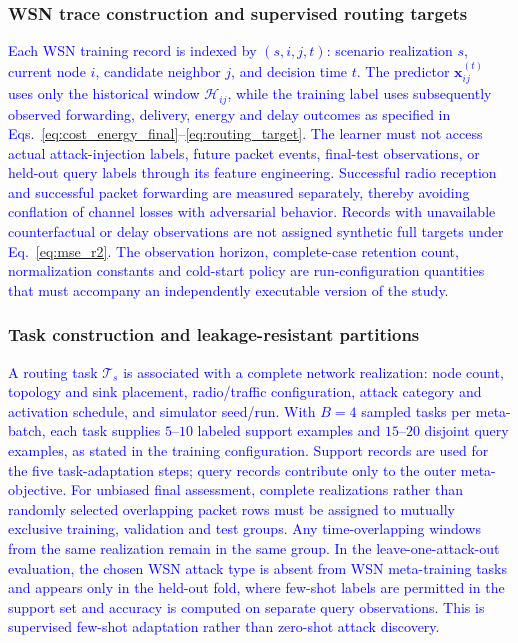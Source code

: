 \documentclass[pdflatex,sn-mathphys-num]{sn-jnl}
\newcommand{\Revised}[1]{\textcolor{blue}{#1}}
\begin{document}
\subsubsection{WSN trace construction and supervised routing targets}
\Revised{Each WSN training record is indexed by $(s,i,j,t)$: scenario realization $s$, current node $i$, candidate neighbor $j$, and decision time $t$. The predictor $\mathbf x_{ij}^{(t)}$ uses only the historical window $\mathcal H_{ij}$, while the training label uses subsequently observed forwarding, delivery, energy and delay outcomes as specified in Eqs.~\eqref{eq:cost_energy_final}--\eqref{eq:routing_target}. The learner must not access actual attack-injection labels, future packet events, final-test observations, or held-out query labels through its feature engineering. Successful radio reception and successful packet forwarding are measured separately, thereby avoiding conflation of channel losses with adversarial behavior. Records with unavailable counterfactual or delay observations are not assigned synthetic full targets under Eq.~\eqref{eq:mse_r2}. The observation horizon, complete-case retention count, normalization constants and cold-start policy are run-configuration quantities that must accompany an independently executable version of the study.}

\subsubsection{Task construction and leakage-resistant partitions}
\Revised{A routing task $\mathcal T_s$ is associated with a complete network realization: node count, topology and sink placement, radio/traffic configuration, attack category and activation schedule, and simulator seed/run. With $B=4$ sampled tasks per meta-batch, each task supplies $5$--$10$ labeled support examples and $15$--$20$ disjoint query examples, as stated in the training configuration. Support records are used for the five task-adaptation steps; query records contribute only to the outer meta-objective. For unbiased final assessment, complete realizations rather than randomly selected overlapping packet rows must be assigned to mutually exclusive training, validation and test groups. Any time-overlapping windows from the same realization remain in the same group. In the leave-one-attack-out evaluation, the chosen WSN attack type is absent from WSN meta-training tasks and appears only in the held-out fold, where few-shot labels are permitted in the support set and accuracy is computed on separate query observations. This is supervised few-shot adaptation rather than zero-shot attack discovery.}
\end{document}

